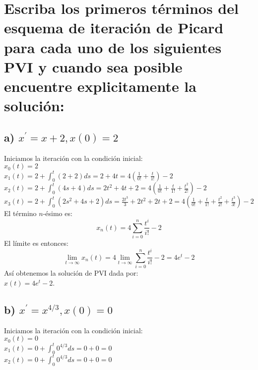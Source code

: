 \section{ Escriba los primeros términos del esquema de iteración de Picard para cada uno de los siguientes PVI y cuando sea posible encuentre explicitamente la solución:}

\subsection*{a) $x^{\prime}=x+2, x(0)=2$}

Iniciamos la iteración con la condición inicial:\\

    $x_{0}(t)=2$\\
    
    $x_{1}(t)=2+\int_{0}^{t}(2+2) ds= 2+ 4t=4\left(\frac{1}{0 !}+\frac{t}{1 !}\right)-2$\\
    
    $x_{2} (t)=2+\int_{0}^{t}(4s+4) ds =2t^2 + 4t + 2= 4\left(\frac{1}{0 !}+\frac{t}{1 !}+\frac{t^{2}}{2 !}\right)-2$\\
    
    $x_{3}(t)=2+\int_{0}^{t}\left(2 s^{2}+4 s+2\right) d s=\frac{2 t^{3}}{3}+2 t^{2}+2 t+2=4\left(\frac{1}{0 !}+\frac{t}{1 !}+\frac{t^{2}}{2 !}+\frac{t^{3}}{3 !}\right)-2$\\
    
El término $n$-ésimo es:
$$
x_{n}(t)=4 \sum_{i=0}^{n} \frac{t^{i}}{i !}-2
$$
El límite es entonces:
$$
\lim _{t \rightarrow \infty} x_{n}(t)=4 \lim _{t \rightarrow \infty} \sum_{i=0}^{n} \frac{t^{i}}{i !}-2=4 e^{t}-2
$$
Así obtenemos la solución de PVI dada por:\\

$x(t)=4 e^{t}-2$.

\subsection*{b) $x^{\prime}=x^{4 / 3}, x(0)=0$}

Iniciamos la iteración con la condición inicial:\\

$x_{0}(t)=0$ \\

$x_{1}(t)=0+\int_{0}^{t} 0^{4 / 3} ds= 0+0= 0$ \\

$x_{2}(t)=0+\int_{0}^{t} 0^{4 / 3} ds= 0+0= 0$\\


